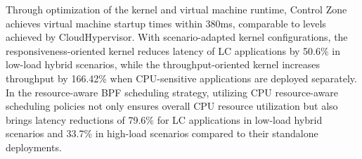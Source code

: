 Through optimization of the kernel and virtual machine runtime, Control Zone achieves virtual machine startup times within 380ms, comparable to levels achieved by CloudHypervisor. With scenario-adapted kernel configurations, the responsiveness-oriented kernel reduces latency of LC applications by 50.6\% in low-load hybrid scenarios, while the throughput-oriented kernel increases throughput by 166.42\% when CPU-sensitive applications are deployed separately. In the resource-aware BPF scheduling strategy, utilizing CPU resource-aware scheduling policies not only ensures overall CPU resource utilization but also brings latency reductions of 79.6\% for LC applications in low-load hybrid scenarios and 33.7\% in high-load scenarios compared to their standalone deployments.


\pagestyle{enfrontmatterstyle}%
\cleardoublepage\pagestyle{frontmatterstyle}%

